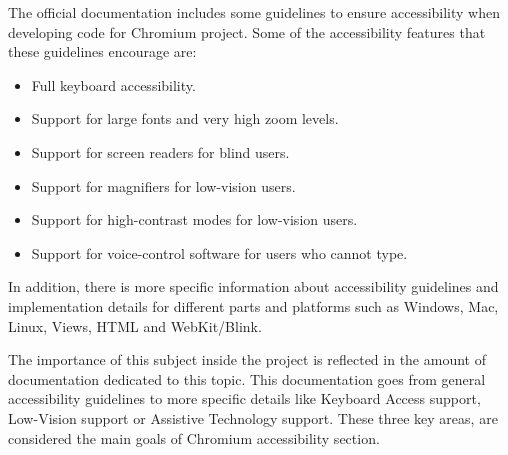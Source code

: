 The official documentation includes some guidelines to ensure accessibility when developing code for Chromium project. Some of the accessibility features that these guidelines encourage are:
\begin{itemize}
    \item Full keyboard accessibility.
    \item Support for large fonts and very high zoom levels.
    \item Support for screen readers for blind users.
    \item Support for magnifiers for low-vision users.
    \item Support for high-contrast modes for low-vision users.
    \item Support for voice-control software for users who cannot type.
\end{itemize}

In addition, there is more specific information about accessibility guidelines and implementation details for different parts and platforms such as Windows, Mac, Linux, Views, HTML and WebKit/Blink.

The importance of this subject inside the project is reflected in the amount of documentation dedicated to this topic. This documentation goes from general accessibility guidelines to more specific details like Keyboard Access support, Low-Vision support or Assistive Technology support. These three key areas, are considered the main goals of Chromium accessibility section.
